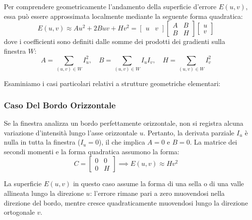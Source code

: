 ﻿\documentclass[11pt, a4paper]{article}
\begin{document}
Per comprendere geometricamente l'andamento della superficie d'errore $E(u,v)$, essa può essere approssimata localmente mediante la seguente forma quadratica:
\begin{equation}
    E(u,v) \approx A u^2 + 2 B u v + H v^2 = \begin{bmatrix} u & v \end{bmatrix} \begin{bmatrix} A & B \\ B & H \end{bmatrix} \begin{bmatrix} u \\ v \end{bmatrix}
\end{equation}
dove i coefficienti sono definiti dalle somme dei prodotti dei gradienti sulla finestra $W$:
\begin{equation}
    A = \sum_{(u,v) \in W} I_u^2, \quad B = \sum_{(u,v) \in W} I_u I_v, \quad H = \sum_{(u,v) \in W} I_v^2
\end{equation}


Esaminiamo i casi particolari relativi a strutture geometriche elementari:

\subsubsection{Caso Del Bordo Orizzontale}
Se la finestra analizza un bordo perfettamente orizzontale, non si registra alcuna variazione d'intensità lungo l'asse orizzontale $u$. Pertanto, la derivata parziale $I_u$ è nulla in tutta la finestra ($I_u = 0$), il che implica $A = 0$ e $B = 0$. La matrice dei secondi momenti e la forma quadratica assumono la forma:
\begin{equation}
    C = \begin{bmatrix} 0 & 0 \\ 0 & H \end{bmatrix} \implies E(u,v) \approx H v^2
\end{equation}


La superficie $E(u,v)$ in questo caso assume la forma di una sella o di una valle allineata lungo la direzione $u$: l'errore rimane pari a zero muovendosi nella direzione del bordo, mentre cresce quadraticamente muovendosi lungo la direzione ortogonale $v$.
\end{document}
